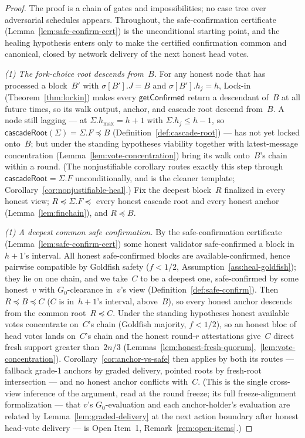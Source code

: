 \ifx\litemode\undefined\documentclass{article}\fi
\newcommand{\hmax}{\ensuremath{h_{\max}}\xspace}
\newcommand{\getConfirmed}{\textsf{getConfirmed}\xspace}
\newcommand{\Gzero}{\ensuremath{G_{0}}}
\newcommand{\cascadeRoot}{\textsf{cascadeRoot}\xspace}
\theoremstyle{plain}
\theoremstyle{definition}
\theoremstyle{remark}
\begin{document}
\begin{proof}
The proof is a chain of gates and impossibilities; no case tree over adversarial
schedules appears.  Throughout, the safe-confirmation certificate
(Lemma~\ref{lem:safe-confirm-cert}) is the unconditional starting point, and the
healing hypothesis enters only to make the certified confirmation common and
canonical, closed by network delivery of the next honest head votes.

\emph{(1) The fork-choice root descends from~\(B\).}  For any honest node that has
processed a block~\(B'\) with \(\sigma[B'].J = B\) and \(\sigma[B'].h_j = h\),
Lock-in (Theorem~\ref{thm:lockin}) makes every \(\getConfirmed\) return a
descendant of~\(B\) at all future times, so its walk output, anchor, and cascade
root descend from~\(B\).  A node still lagging --- at \(\Sigma.\hmax = h+1\) with
\(\Sigma.h_j \leq h-1\), so \(\cascadeRoot(\Sigma) = \Sigma.F \preceq B\)
(Definition~\ref{def:cascade-root}) --- has not yet locked onto~\(B\); but under
the standing hypotheses viability together with latest-message concentration
(Lemma~\ref{lem:vote-concentration}) bring its walk onto~\(B\)'s chain within a round.
(The nonjustifiable corollary routes exactly this step through
\(\cascadeRoot = \Sigma.F\) unconditionally, and is the cleaner template;
Corollary~\ref{cor:nonjustifiable-heal}.)  Fix the deepest block~\(R\) finalized in
every honest view; \(R \preceq \Sigma.F \preceq\) every honest cascade root and
every honest anchor (Lemma~\ref{lem:finchain}), and \(R \preceq B\).

\emph{(1) A deepest common safe confirmation.}  By the safe-confirmation
certificate (Lemma~\ref{lem:safe-confirm-cert}) some honest validator
safe-confirmed a block in~\(h+1\)'s interval.  All honest safe-confirmed blocks are
available-confirmed,
hence pairwise compatible by Goldfish safety (\(f<1/2\),
Assumption~\ref{ass:heal-goldfish}); they lie on one chain, and we take~\(C\) to be
a deepest one, safe-confirmed by some honest~\(v\) with \(\Gzero\)-clearance
in~\(v\)'s view (Definition~\ref{def:safe-confirm}).  Then \(R \preceq B \preceq C\)
(\(C\) is in~\(h+1\)'s interval, above~\(B\)), so every honest anchor descends
from the common root~\(R \preceq C\).  Under the standing hypotheses honest
available votes concentrate on~\(C\)'s chain (Goldfish majority, \(f<1/2\)), so an
honest bloc of head votes lands on~\(C\)'s chain and the honest round-\(r\)
attestations give~\(C\) direct fresh support greater than~\(2n/3\)
(Lemmas~\ref{lem:honest-fresh-quorum},~\ref{lem:vote-concentration}).
Corollary~\ref{cor:anchor-vs-safe} then applies by both its routes --- fallback
grade-1 anchors by graded delivery, pointed roots by fresh-root intersection --- and
no honest anchor conflicts with~\(C\).  (This is the single cross-view inference of
the argument, read at the round freeze; its full freeze-alignment
formalization --- that \(v\)'s \(\Gzero\)-evaluation and each anchor-holder's
evaluation are related by Lemma~\ref{lem:graded-delivery} at the next action
boundary after honest head-vote delivery --- is Open Item~1,
Remark~\ref{rem:open-items}.)


\end{proof}
\end{document}
